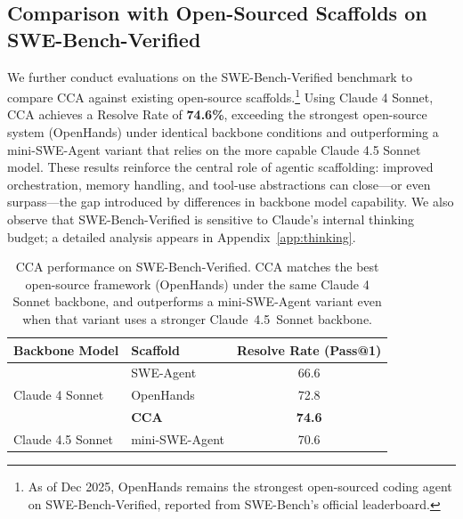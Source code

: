 \subsection{Comparison with Open-Sourced Scaffolds on SWE-Bench-Verified}

We further conduct evaluations on the SWE-Bench-Verified benchmark \citep{swebench} to compare CCA against existing open-source scaffolds.\footnote{As of Dec 2025, OpenHands remains the strongest open-sourced coding agent on SWE-Bench-Verified, reported from SWE-Bench's official leaderboard.} Using Claude 4 Sonnet, CCA achieves a Resolve Rate of \textbf{74.6\%}, exceeding the strongest open-source system (OpenHands) under identical backbone conditions and outperforming a mini-SWE-Agent variant that relies on the more capable Claude 4.5 Sonnet model. These results reinforce the central role of agentic scaffolding: improved orchestration, memory handling, and tool-use abstractions can close—or even surpass—the gap introduced by differences in backbone model capability. We also observe that SWE-Bench-Verified is sensitive to Claude’s internal thinking budget; a detailed analysis appears in Appendix~\ref{app:thinking}.


\begin{table}[h]
\centering
\begin{tabular}{l l c}
\toprule
\textbf{Backbone Model} & \textbf{Scaffold} & \textbf{Resolve Rate (Pass@1)} \\
\midrule

\multirow{3}{*}{Claude 4 Sonnet}
    & SWE-Agent            & 66.6 \\
    & OpenHands \citep{openhands}            & 72.8 \\
    & \textbf{CCA}         & \textbf{74.6} \\
\midrule

Claude 4.5 Sonnet
    & mini-SWE-Agent       & 70.6 \\
\bottomrule
\end{tabular}
\caption{CCA performance on SWE-Bench-Verified. CCA matches the best open-source framework (OpenHands) under the same Claude 4 Sonnet backbone, and outperforms a mini-SWE-Agent variant even when that variant uses a stronger Claude~4.5~Sonnet backbone.}
\label{tab:swe_verified}
\end{table}



